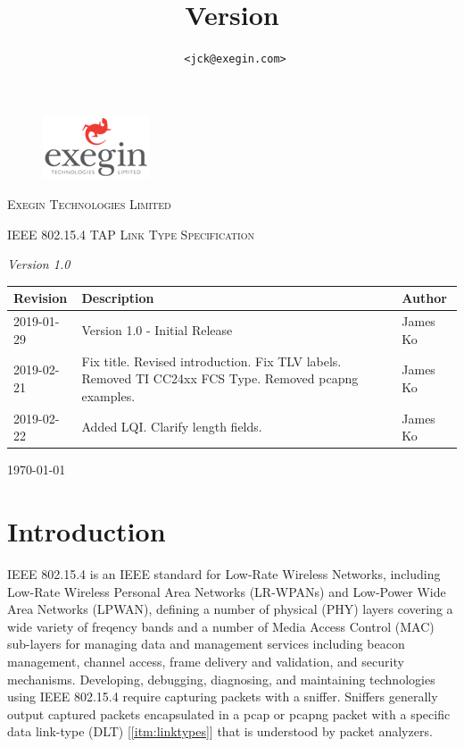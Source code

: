 \documentclass[12pt]{article}
\title{
\maintitle
\\\company
\\\hfill\\\normalsize Version \versionnumber
}
\author{\authorname~\tt{<jck@exegin.com>}}
\newcommand\versionnumber{1.0}
\renewcommand\_{\textunderscore\allowbreak}
\begin{document}
\begin{titlepage}
    \vspace{5cm}
    \begin{figure}
        \includegraphics[scale=1]{exegin.png}
    \end{figure}
    \vspace{2cm}
    {\scshape\LARGE Exegin Technologies Limited \par}
    \vspace{5cm}
    {\scshape\Large IEEE 802.15.4 TAP Link Type Specification\par}
    {\itshape Version \versionnumber}
    \vspace{2cm}
    \vfill

    \vfill

    \begin{tabular}{|p{2cm}|p{11.5cm}| p{3cm}|}
\hline
    \textbf{Revision} & \textbf{Description} & \textbf{Author}\\
\hline
    2019-01-29 & Version 1.0 - Initial Release & James Ko\\
\hline
    2019-02-21 & Fix title. Revised introduction. Fix TLV labels.
    Removed TI CC24xx FCS Type. Removed pcapng examples. & James Ko\\
\hline
    2019-02-22 & Added LQI. Clarify length fields. & James Ko\\
\hline
\end{tabular}

    {\large \today\par}
\end{titlepage}

\newpage
\tableofcontents

\newpage
\section{Introduction}\label{sec:intro}
IEEE 802.15.4 is an IEEE standard for Low-Rate Wireless Networks, including
Low-Rate Wireless Personal Area Networks (LR-WPANs) and Low-Power Wide Area
Networks (LPWAN), defining a number of physical (PHY) layers covering a wide
variety of freqency bands and a number of Media Access Control (MAC)
sub-layers for managing data and management services including beacon
management, channel access, frame delivery and validation, and security
mechanisms.  Developing, debugging, diagnosing, and maintaining technologies
using IEEE 802.15.4 require capturing packets with a sniffer. Sniffers
generally output captured packets encapsulated in a pcap or pcapng packet
with a specific data link-type (DLT) [\ref{itm:linktypes}] that is understood
by packet analyzers.
\end{document}
